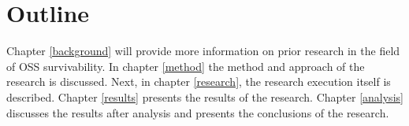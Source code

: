 \section{Outline}

Chapter \ref{background} will provide more information on prior research in the
field of OSS survivability. In chapter \ref{method} the method and approach of
the research is discussed. Next, in chapter \ref{research}, the research
execution itself is described. Chapter \ref{results} presents the results of
the research. Chapter \ref{analysis} discusses the results after analysis and
presents the conclusions of the research.

\begin{comment}

INTRODUCTION

An introduction and overview of your thesis. Be sure to structure your thesis
such that you do not have to repeat yourself later. In this section you do not
cover details, but you give the reader an idea of the context, a brief overview
of the research, and how the remainder of the thesis is structured.

\end{comment}
\begin{comment}

MOTIVATION

This section describes in detail what problem the research is addressing, and
what the motivation is to address this problem.

There is a concise and objective statement of the research questions (or
hypotheses you are testing) and goals. It is made clear why these questions and
goals are important and relevant to the outside world (i.e., the field of
research or industry that you are addressing). You can already split the main
research question into sub questions in this chapter.

This section also describes an analysis of the problem: where does it occur and
how, how often, and what are the consequences?

An important part is also to scope to research: what aspects are included and
what aspects are deliberately left out, and why? An example introduction can be
found on Paul Klint’s
homepage\footnote{http://homepages.cwi.nl/~paulk/thesesMasterSoftwareEngineering/2006/ReinierLabee.pdf}.
\end{comment}
